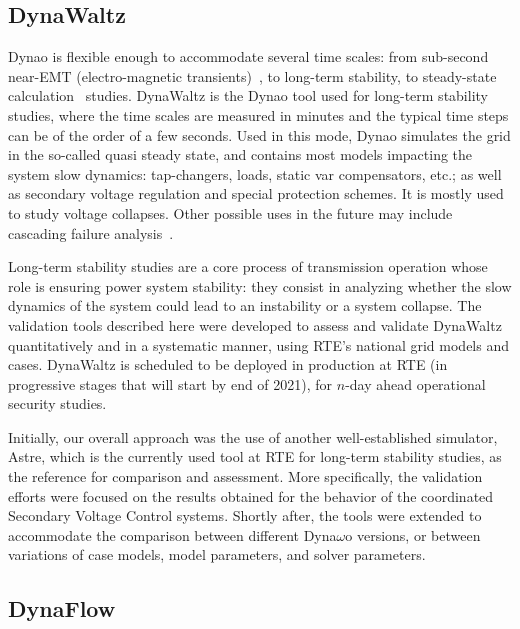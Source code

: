 \documentclass[conference]{IEEEtran}
\newcommand{\Dynawo}{Dyna\textomega o\xspace} %
\begin{document}
\subsection{DynaWaltz}

\Dynawo is flexible enough to accommodate several time scales: from
sub-second near-EMT (electro-magnetic transients)~\cite{Masoon21}, to
long-term stability, to steady-state calculation~\cite{Cossart21}
studies. DynaWaltz is the \Dynawo tool used for long-term stability
studies, where the time scales are measured in minutes and the typical
time steps can be of the order of a few seconds. Used in this mode,
\Dynawo simulates the grid in the so-called quasi steady state, and
contains most models impacting the system slow dynamics: tap-changers,
loads, static var compensators, etc.; as well as secondary voltage
regulation and special protection schemes. It is mostly used to study
voltage collapses. Other possible uses in the future may include
cascading failure analysis~\cite{Bialek16}.

Long-term stability studies are a core process of transmission operation whose
role is ensuring power system stability: they consist in analyzing whether the
slow dynamics of the system could lead to an instability or a system
collapse. The validation tools described here were developed to assess and
validate DynaWaltz quantitatively and in a systematic manner, using RTE's
national grid models and cases. DynaWaltz is scheduled to be deployed in
production at RTE (in progressive stages that will start by end of 2021), for
$n$-day ahead operational security studies.

Initially, our overall approach was the use of another
well-established simulator, Astre, which is the currently used tool at
RTE for long-term stability studies, as the reference for comparison
and assessment. More specifically, the validation efforts were focused
on the results obtained for the behavior of the coordinated Secondary
Voltage Control systems. Shortly after, the tools were extended to
accommodate the comparison between different Dyna$\omega$o versions,
or between variations of case models, model parameters, and solver
parameters.



\subsection{DynaFlow}
\end{document}
